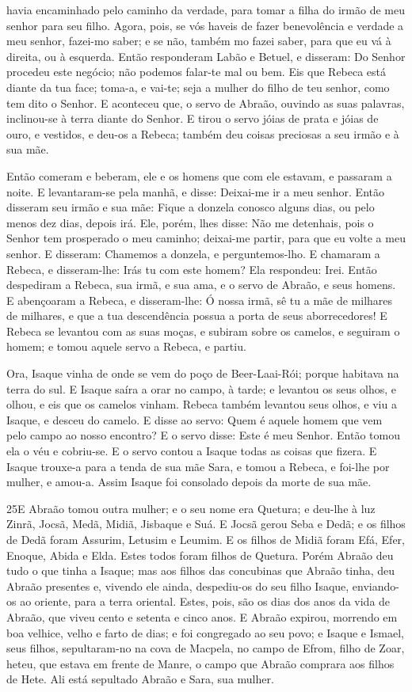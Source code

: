 havia encaminhado pelo caminho da verdade, para tomar a filha do
irmão de meu senhor para seu filho. Agora, pois, se vós
haveis de fazer benevolência e verdade a meu senhor, fazei-mo saber;
e se não, também mo fazei saber, para que eu vá à direita, ou à
esquerda. Então responderam Labão e Betuel, e disseram: Do
Senhor procedeu este negócio; não podemos falar-te mal ou bem.
Eis que Rebeca está diante da tua face; toma-a, e vai-te;
seja a mulher do filho de teu senhor, como tem dito o Senhor.
E aconteceu que, o servo de Abraão, ouvindo as suas palavras,
inclinou-se à terra diante do Senhor. E tirou o servo jóias
de prata e jóias de ouro, e vestidos, e deu-os a Rebeca; também deu
coisas preciosas a seu irmão e à sua mãe.

Então comeram e beberam, ele e os homens que com ele estavam, e
passaram a noite. E levantaram-se pela manhã, e disse: Deixai-me ir
a meu senhor. Então disseram seu irmão e sua mãe: Fique a
donzela conosco alguns dias, ou pelo menos dez dias, depois irá.
Ele, porém, lhes disse: Não me detenhais, pois o Senhor tem
prosperado o meu caminho; deixai-me partir, para que eu volte a meu
senhor. E disseram: Chamemos a donzela, e perguntemos-lho.
E chamaram a Rebeca, e disseram-lhe: Irás tu com este homem?
Ela respondeu: Irei. Então despediram a Rebeca, sua irmã, e
sua ama, e o servo de Abraão, e seus homens. E abençoaram a
Rebeca, e disseram-lhe: Ó nossa irmã, sê tu a mãe de milhares de
milhares, e que a tua descendência possua a porta de seus
aborrecedores! E Rebeca se levantou com as suas moças, e
subiram sobre os camelos, e seguiram o homem; e tomou aquele servo a
Rebeca, e partiu.

Ora, Isaque vinha de onde se vem do poço de Beer-Laai-Rói; porque
habitava na terra do sul. E Isaque saíra a orar no campo, à
tarde; e levantou os seus olhos, e olhou, e eis que os camelos
vinham. Rebeca também levantou seus olhos, e viu a Isaque, e
desceu do camelo. E disse ao servo: Quem é aquele homem que
vem pelo campo ao nosso encontro? E o servo disse: Este é meu
Senhor. Então tomou ela o véu e cobriu-se. E o servo contou a
Isaque todas as coisas que fizera. E Isaque trouxe-a para a
tenda de sua mãe Sara, e tomou a Rebeca, e foi-lhe por mulher, e
amou-a. Assim Isaque foi consolado depois da morte de sua mãe.

\smallskip

\lettrine{25} E Abraão tomou outra mulher; e o seu nome era
Quetura; e deu-lhe à luz Zinrã, Jocsã, Medã, Midiã, Jisbaque e
Suá. E Jocsã gerou Seba e Dedã; e os filhos de Dedã foram
Assurim, Letusim e Leumim. E os filhos de Midiã foram Efá, Efer,
Enoque, Abida e Elda. Estes todos foram filhos de Quetura. Porém
Abraão deu tudo o que tinha a Isaque; mas aos filhos das
concubinas que Abraão tinha, deu Abraão presentes e, vivendo ele
ainda, despediu-os do seu filho Isaque, enviando-os ao oriente, para
a terra oriental. Estes, pois, são os dias dos anos da vida de
Abraão, que viveu cento e setenta e cinco anos. E Abraão
expirou, morrendo em boa velhice, velho e farto de dias; e foi
congregado ao seu povo; e Isaque e Ismael, seus filhos,
sepultaram-no na cova de Macpela, no campo de Efrom, filho de Zoar,
heteu, que estava em frente de Manre, o campo que Abraão
comprara aos filhos de Hete. Ali está sepultado Abraão e Sara, sua
mulher.

